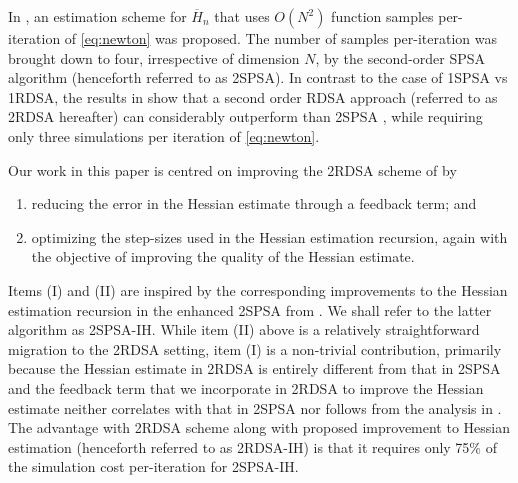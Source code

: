 \documentclass[letterpaper, 10 pt, conference]{ieeeconf}  %
\begin{document}
In \cite{fabian}, an estimation scheme for $\overline H_n$ that uses $O(N^2)$ function samples per-iteration of \eqref{eq:newton} was proposed.
The number of samples per-iteration was brought down to four, irrespective of dimension $N$, by the second-order SPSA algorithm (henceforth referred to as 2SPSA). 
In contrast to the case of 1SPSA vs 1RDSA, the results in \cite{prashanth2015rdsa} show that a second order RDSA approach (referred to as 2RDSA hereafter) can considerably outperform than 2SPSA \cite{spall_adaptive}, while requiring only three simulations per iteration of \eqref{eq:newton}.

Our work in this paper is centred on improving the 2RDSA scheme of \cite{prashanth2015rdsa} by 
\begin{enumerate}[label={\bf\Roman*}]
\item reducing the error in the Hessian estimate through a feedback term; and
\item optimizing the step-sizes used in the Hessian estimation recursion, again with the objective of improving the quality of the Hessian estimate.
\end{enumerate}

Items (I) and (II) are inspired by the corresponding improvements to the Hessian estimation recursion in the enhanced 2SPSA from \cite{spall-jacobian}. We shall refer to the latter algorithm as 2SPSA-IH. While item (II) above is a relatively straightforward migration to the 2RDSA setting, item (I) is a non-trivial contribution, primarily because the Hessian estimate in 2RDSA is entirely different from that in 2SPSA and the feedback term that we incorporate in 2RDSA to improve the Hessian estimate neither correlates with that in 2SPSA nor follows from the analysis in \cite{spall-jacobian}. 
The advantage with 2RDSA scheme along with proposed improvement to Hessian estimation (henceforth referred to as 2RDSA-IH) is that it requires only 75\% of the simulation cost per-iteration for 2SPSA-IH.
\end{document}
